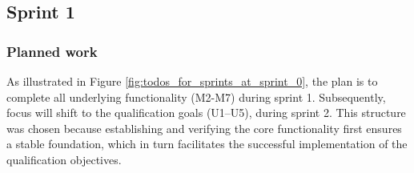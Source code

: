 \subsection{Sprint 1}

\subsubsection{Planned work}

As illustrated in Figure \ref{fig:todos_for_sprints_at_sprint_0}, the plan is to complete all underlying functionality (M2-M7) during sprint 1. 
Subsequently, focus will shift to the qualification goals (U1–U5), during sprint 2. This structure was chosen because establishing and verifying the core functionality 
first ensures a stable foundation, which in turn facilitates the successful implementation of the qualification objectives.


